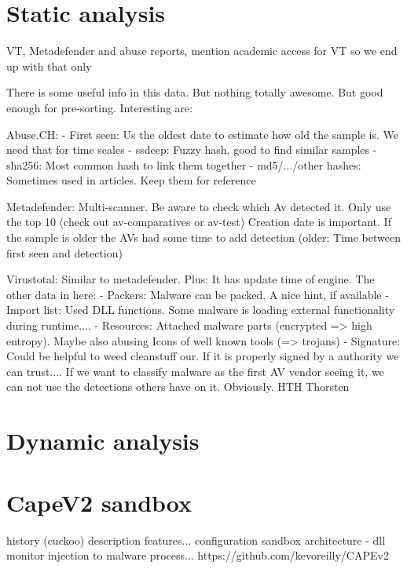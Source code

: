 \section{Static analysis}
VT, Metadefender and abuse reports, mention academic access for VT so we end up with that only

There is some useful info in this data. But nothing totally awesome. But good enough for pre-sorting.
Interesting are:

Abuse.CH:
- First seen: Us the oldest date to estimate how old the sample is. We need that for time scales
- ssdeep: Fuzzy hash, good to find similar samples
- sha256: Most common hash to link them together
- md5/.../other hashes: Sometimes used in articles. Keep them for reference

Metadefender:
Multi-scanner. Be aware to check which Av detected it. Only use the top 10 (check out av-comparatives or av-test)
Creation date is important. If the sample is older the AVs had some time to add detection (older: Time between first seen and detection)


Virustotal:
Similar to metadefender. Plus: It has update time of engine.
The other data in here:
- Packers: Malware can be packed. A nice hint, if available
- Import list: Used DLL functions. Some malware is loading external functionality during runtime....
- Resources: Attached malware parts (encrypted => high entropy). Maybe also abusing Icons of well known tools (=> trojans)
- Signature: Could be helpful to weed cleanstuff our. If it is properly signed by a authority we can trust....
If we want to classify malware as the first AV vendor seeing it, we can not use the detections others have on it. Obviously.
HTH
Thorsten

\section{Dynamic analysis}
\section{CapeV2 sandbox}
history (cuckoo)
description
    features...
configuration
sandbox architecture - dll monitor injection to malware process...
https://github.com/kevoreilly/CAPEv2


